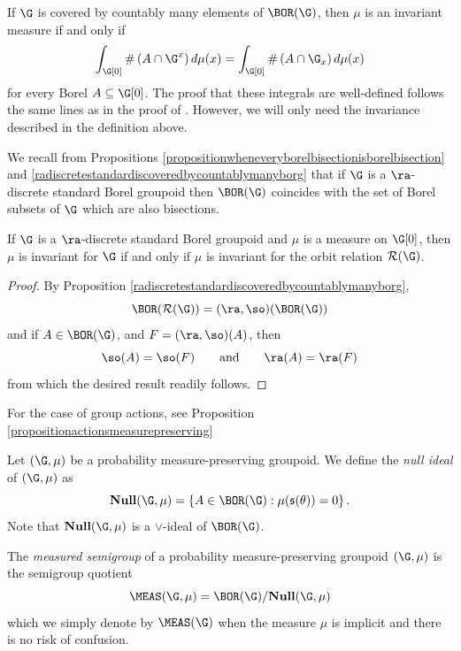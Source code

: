 \begin{remark}
If $\G$ is covered by countably many elements of $\BOR(\G)$, then $\mu$ is an invariant measure if and only if
\[\int_{\G[0]}\#\left(A\cap\G^x\right)d\mu(x)=\int_{\G[0]}\#\left(A\cap\G_x\right)d\mu(x)\]
for every Borel $A\subseteq\G[0]$. The proof that these integrals are well-defined follows the same lines as in the proof of \cite[Theorem 2]{MR0578656}. However, we will only need the invariance described in the definition above.
\end{remark}

We recall from Propositions \ref{propositionwheneveryborelbisectionisborelbisection} and \ref{radiscretestandardiscoveredbycountablymanyborg} that if $\G$ is a $\ra$-discrete standard Borel groupoid then $\BOR(\G)$ coincides with the set of Borel subsets of $\G$ which are also bisections.

\begin{proposition}\label{propositionmeasureinvariancefororbitrelation}
If $\G$ is a $\ra$-discrete standard Borel groupoid and $\mu$ is a measure on $\G[0]$, then $\mu$ is invariant for $\G$ if and only if $\mu$ is invariant for the orbit relation $\mathcal{R}(\G)$.
\end{proposition}
\begin{proof}
By Proposition \ref{radiscretestandardiscoveredbycountablymanyborg},
\[\BOR(\mathcal{R}(\G))=(\ra,\so)(\BOR(\G))\]
and if $A\in\BOR(\G)$, and $F=(\ra,\so)(A)$, then
\[\so(A)=\so(F)\qquad\text{and}\qquad\ra(A)=\ra(F)\]
from which the desired result readily follows.\qedhere
\end{proof}

For the case of group actions, see Proposition \ref{propositionactionsmeasurepreserving}

Let $(\G,\mu)$ be a probability measure-preserving groupoid. We define the \emph{null ideal} of $(\G,\mu)$ as
\[\mathbf{Null}(\G,\mu)=\left\{A\in\BOR(\G):\mu(\mathfrak{s}(\theta))=0\right\}.\]
Note that $\mathbf{Null}(\G,\mu)$ is a $\lor$-ideal of $\BOR(\G)$.

\begin{definition}\label{definitionmeasuredsemigroup}
The \emph{measured semigroup} of a probability measure-preserving groupoid $(\G,\mu)$ is the semigroup quotient
\[\MEAS(\G,\mu)=\BOR(\G)/\mathbf{Null}(\G,\mu)\]
which we simply denote by $\MEAS(\G)$ when the measure $\mu$ is implicit and there is no risk of confusion.
\end{definition}

